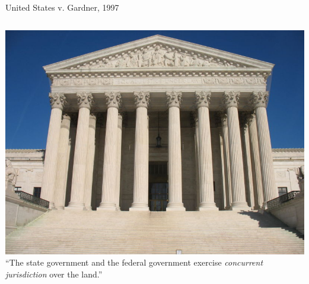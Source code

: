 %

\begin{frame}{United States v. Gardner, 1997}
    \begin{columns}[c]
            \centering
            \includegraphics[width=\textwidth]{img/supcourt-building.jpg} \\
        \column{0.5\textheight}
            ``The state government and the federal government exercise \emph{concurrent jurisdiction} over the land.''
    \end{columns}
\end{frame}

